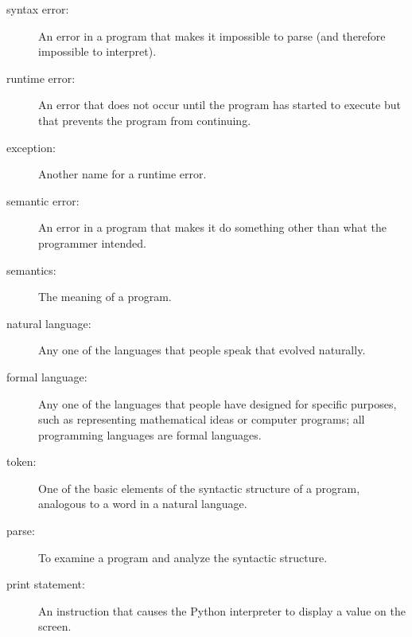 \begin{description}
\item[syntax error:]  An error in a program that makes it impossible
to parse (and therefore impossible to interpret).

\item[runtime error:]  An error that does not occur until the program
has started to execute but that prevents the program from continuing.

\item[exception:]  Another name for a runtime error.

\item[semantic error:]   An error in a program that makes it do something
other than what the programmer intended.

\item[semantics:]  The meaning of a program.

\item[natural language:]  Any one of the languages that people speak that
evolved naturally.

\item[formal language:]  Any one of the languages that people have designed
for specific purposes, such as representing mathematical ideas or
computer programs; all programming languages are formal languages.

\item[token:]  One of the basic elements of the syntactic structure of
a program, analogous to a word in a natural language.

\item[parse:]  To examine a program and analyze the syntactic structure.

\item[print statement:]  An instruction that causes the Python
interpreter to display a value on the screen.


\end{description}
